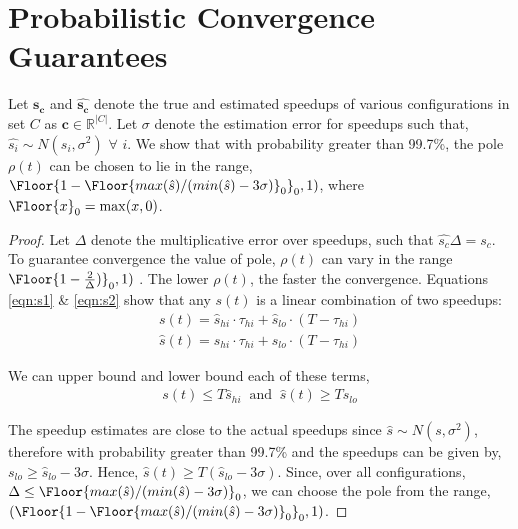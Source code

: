 \section{Probabilistic Convergence Guarantees}
\begin{theorem}
  Let $\mathbf{s_c}$ and $\hat{\mathbf{s_c}}$ denote the true and
  estimated speedups of various configurations in set $C$ as
  $\mathbf{c} \in \mathbb{R}^{|C|}$. Let $\sigma$ denote the
  estimation error for speedups such that, $\hat{s_i} \sim N(s_i,
  \sigma^2)$ $\forall$ $i$. We show that with probability greater than
  99.7\%, the pole $\rho(t)$ can be chosen to lie in the range,
  $\Floor{1- \Floor{max(\hat{s})/(min(\hat{s}) - 3\sigma)}_0}_0, 1)$,
  where $\Floor{x}_0 = \max(x,0)$.
\end{theorem}

\begin{proof}
  Let $\Delta$ denote the multiplicative error over speedups, such
  that $ \widehat{s_c}\Delta = s_c $. To guarantee convergence the
  value of pole, $\rho(t)$ can vary in the range
  $\Floor{1-\frac{2}{\Delta})}_0, 1)$ \cite{ICSE2014}. The lower
  $\rho(t)$, the faster the convergence. Equations \ref{eqn:s1} \&
  \ref{eqn:s2} show that any $s(t)$ is a linear combination of two
  speedups:
\begin{align}
  s(t) = \hat{s}_{hi} \cdot \tau_{hi} + \hat{s}_{lo} \cdot (T -
  \tau_{hi})
\end{align}
\begin{align}
  \widehat{s}(t) = s_{hi} \cdot \tau_{hi} + s_{lo} \cdot (T -
  \tau_{hi})
\end{align}

We can upper bound and lower bound each of these terms,
\begin{align}
s(t) \leq T \hat{s}_{hi} \;\; \text{and} \;\; \hat{s}(t) \geq T s_{lo}
\end{align}

The speedup estimates are close to the actual speedups since $\hat{s}
\sim N(s, \sigma^2)$, therefore with probability greater than 99.7\%
and the speedups can be given by, $s_{lo} \geq \hat{s}_{lo} - 3
\sigma$. Hence, $\hat{s}(t) \geq T (\hat{s}_{lo} -3 \sigma)$. Since,
over all configurations, $\Delta \leq
\Floor{max(\hat{s})/(min(\hat{s}) - 3\sigma)}_0$, we can choose the
pole from the range, $(\Floor{1- \Floor{max(\hat{s})/(min(\hat{s}) -
    3\sigma)}_0}_0, 1)$.


\end{proof}
